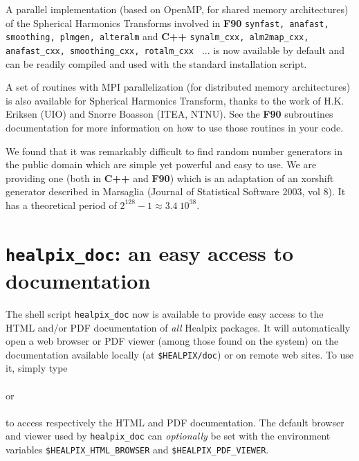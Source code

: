 \documentclass[12pt,twoside]{article}
\begin{document}
A parallel implementation (based on OpenMP, for shared memory architectures) of the Spherical Harmonics
Transforms involved in \textbf{F90} \texttt{synfast, anafast, smoothing, plmgen, alteralm}
and \textbf{C++}
\texttt{synalm\_cxx, alm2map\_cxx, anafast\_cxx, smoothing\_cxx, rotalm\_cxx } ... is now
available by default and can be readily compiled and used with the standard installation script. 

A set of routines with MPI parallelization (for distributed memory architectures)
 is also available for Spherical Harmonics Transform, thanks to the work of H.K. Eriksen
 (UIO) and Snorre Boasson (ITEA, NTNU). See the \textbf{F90}
 subroutines documentation for more information on how to use those routines in
 your code.

We found that it was remarkably difficult to find 
random number generators in the public
domain which are simple yet
powerful and easy to use. 
We are providing one (both in \textbf{C++} and \textbf{F90}) which is an adaptation of an xorshift generator described
 in Marsaglia (Journal of Statistical Software 2003, vol 8). It has a theoretical period of $2^{128}-1 \approx 3.4\ 10^{38}$.



\section{\texttt{healpix\_doc}: an easy access to \healpix documentation}
The shell script \texttt{healpix\_doc} now is available to provide easy
access to the HTML and/or PDF documentation of {\em all} Healpix packages.
It will automatically open a web browser or PDF viewer (among those found on the
system) on the documentation
available locally (at \texttt{\$HEALPIX/doc}) or on remote web sites. To use it, simply type\\
 \\
or \\
\\
to access respectively the HTML and PDF documentation. The default browser and
viewer used by \texttt{healpix\_doc} can {\em optionally} be set with the
environment variables
\texttt{\$HEALPIX\_HTML\_BROWSER} and
\texttt{\$HEALPIX\_PDF\_VIEWER}.
\end{document}
